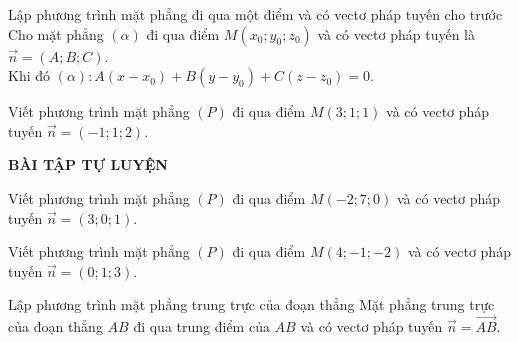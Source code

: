 \begin{dang}{Lập phương trình mặt phẳng đi qua một điểm và có vectơ pháp tuyến cho trước}
Cho mặt phẳng $(\alpha)$ đi qua điểm $M\left(x_0;y_0;z_0\right)$ và có vectơ pháp tuyến là $\overrightarrow{n}=\left(A;B;C\right)$.\\
Khi đó $(\alpha): A\left(x-x_0\right)+B\left(y-y_0\right)+C\left(z-z_0\right)=0$.
\end{dang}
\begin{vd}%
Viết phương trình mặt phẳng $(P)$ đi qua điểm $M\left(3;1;1\right)$ và có vectơ pháp tuyến $\overrightarrow{n}=\left(-1;1;2\right)$.
\end{vd}

\begin{center}
\textbf{BÀI TẬP TỰ LUYỆN}
\end{center}
\begin{bt}%
Viết phương trình mặt phẳng $(P)$ đi qua điểm $M\left(-2;7;0\right)$ và có vectơ pháp tuyến $\overrightarrow{n}=\left(3;0;1\right)$.
\end{bt}
\begin{bt}%
Viết phương trình mặt phẳng $(P)$ đi qua điểm $M\left(4;-1;-2\right)$ và có vectơ pháp tuyến $\overrightarrow{n}=\left(0;1;3\right)$.
\end{bt}
\begin{dang}{Lập phương trình mặt phẳng trung trực của đoạn thẳng}
Mặt phẳng trung trực của đoạn thẳng $AB$ đi qua trung điểm của $AB$ và có vectơ pháp tuyến $\overrightarrow{n}=\overrightarrow{AB}$.
\end{dang}

